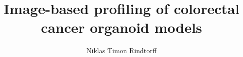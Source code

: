 \title{Image-based profiling of colorectal cancer organoid models}
\author{Niklas Timon Rindtorff}

\degree{} %
\field{} %

